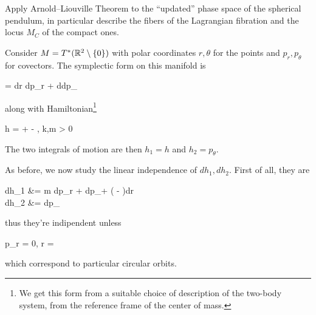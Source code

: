 \documentclass[main.tex]{subfiles}
\begin{document}
\begin{exercise}
	Apply Arnold--Liouville Theorem to the ``updated'' phase space of the spherical pendulum, in particular describe the fibers of the Lagrangian fibration and the locus $M_C$ of the compact ones.
\end{exercise}

\begin{example}
	Consider $M= T^*(\mathbb{R}^2 \setminus \{0\})$ with polar coordinates $r, \theta$ for the points and $p_r, p_\theta$ for covectors. The symplectic form on this manifold is
	\begin{eqalign}
		\omega = dr \wedge dp_r + d\theta \wedge dp_\theta
	\end{eqalign}
	along with Hamiltonian\footnote{We get this form from a suitable choice of description of the two-body system, from the reference frame of the center of mass.}
	\begin{eqalign}
		h =  +  - , \quad k,m > 0
	\end{eqalign}
	The two integrals of motion are then $h_1=h$ and $h_2 = p_\theta$.

	As before, we now study the linear independence of $dh_1, dh_2$. First of all, they are
	\begin{eqalign}
		dh_1 &= m dp_r + dp_\theta + \left(  -  \right)dr\\
		dh_2 &= dp_\theta
	\end{eqalign}
	thus they're indipendent unless
	\begin{eqalign}
		p_r = 0, \quad r = \frac{p_\theta^2}{mk}
	\end{eqalign}
	which correspond to particular circular orbits.


\end{example}
\end{document}
